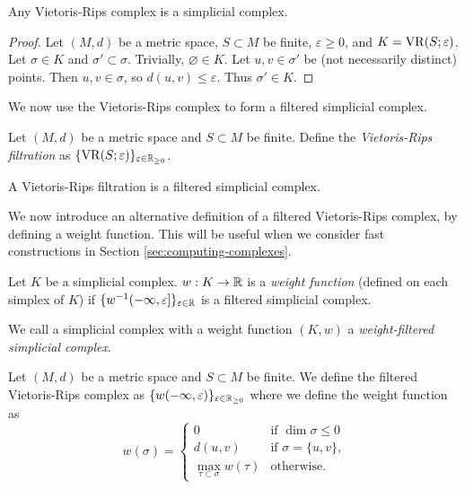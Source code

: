 \begin{lemma} \label{lem:vietoris-rips-is-simplicial-complex}
    Any Vietoris-Rips complex is a simplicial complex.
\end{lemma}

\begin{proof}
    Let $(M, d)$ be a metric space, $S \subset M$ be finite, $\varepsilon \geq 0$, and $K = \operatorname{VR}(S; \varepsilon)$. Let $\sigma \in K$ and $\sigma' \subset \sigma$. Trivially, $\varnothing \in K$. Let $u, v \in \sigma'$ be (not necessarily distinct) points. Then $u, v \in \sigma$, so $d(u, v) \leq \varepsilon$. Thus $\sigma' \in K$.
\end{proof}

We now use the Vietoris-Rips complex to form a filtered simplicial complex.

\begin{definition} \label{def:filtered-vietoris-rips}
    Let $(M, d)$ be a metric space and $S \subset M$ be finite. Define the \emph{Vietoris-Rips filtration} as $\{\operatorname{VR}(S; \varepsilon)\}_{\varepsilon \in \mathbb R_{\geq 0}}$.
\end{definition}

\begin{corollary}
    A Vietoris-Rips filtration is a filtered simplicial complex.
\end{corollary}

We now introduce an alternative definition of a filtered Vietoris-Rips complex, by defining a weight function. This will be useful when we consider fast constructions in Section \ref{sec:computing-complexes}.

\begin{definition}
    Let $K$ be a simplicial complex. $w: K \to \mathbb R$ is a \emph{weight function} (defined on each simplex of $K$) if $\{w^{-1}(-\infty, \varepsilon]\}_{\varepsilon \in \mathbb R}$ is a filtered simplicial complex.
\end{definition}

We call a simplicial complex with a weight function $(K, w)$ a \emph{weight-filtered simplicial complex}.

\begin{definition} \label{def:filtered-vietoris-rips-weight}
    Let $(M, d)$ be a metric space and $S \subset M$ be finite. We define the filtered Vietoris-Rips complex as $\{w(-\infty, \varepsilon)\}_{\varepsilon \in \mathbb R_{\geq 0}}$ where we define the weight function as
    \[ w(\sigma) = \begin{cases}
            0                                  & \text{if $\dim\sigma \leq 0$}  \\
            d(u, v)                            & \text{if $\sigma = \{u, v\}$,} \\
            \max_{\tau \subset \sigma} w(\tau) & \text{otherwise}.
        \end{cases}\]
\end{definition}

